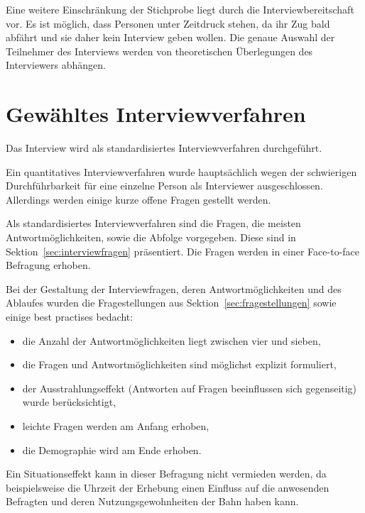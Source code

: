 \documentclass[]{article}
\begin{document}
Eine weitere Einschränkung der Stichprobe liegt durch die Interviewbereitschaft vor. Es ist möglich, dass Personen unter Zeitdruck stehen, da ihr Zug bald abfährt und sie daher kein Interview geben wollen. Die genaue Auswahl der Teilnehmer des Interviews werden von theoretischen Überlegungen des Interviewers abhängen.

\section{Gewähltes Interviewverfahren}
Das Interview wird als standardisiertes Interviewverfahren durchgeführt.

Ein quantitatives Interviewverfahren wurde hauptsächlich wegen der schwierigen Durchführbarkeit für eine einzelne Person als Interviewer ausgeschlossen. Allerdings werden einige kurze offene Fragen gestellt werden.

Als standardisiertes Interviewverfahren sind die Fragen, die meisten Antwortmöglichkeiten, sowie die Abfolge vorgegeben. Diese sind in Sektion~\ref{sec:interviewfragen} präsentiert. Die Fragen werden in einer Face-to-face Befragung erhoben.

Bei der Gestaltung der Interviewfragen, deren Antwortmöglichkeiten und des Ablaufes wurden die Fragestellungen aus Sektion~\ref{sec:fragestellungen} sowie einige best practises bedacht:
\begin{itemize}
	\item die Anzahl der Antwortmöglichkeiten liegt zwischen vier und sieben,
	\item die Fragen und Antwortmöglichkeiten sind möglichst explizit formuliert,
	\item der Ausstrahlungseffekt (Antworten auf Fragen beeinflussen sich gegenseitig) wurde berücksichtigt,
	\item leichte Fragen werden am Anfang erhoben,
	\item die Demographie wird am Ende erhoben.
\end{itemize}

Ein Situationseffekt kann in dieser Befragung nicht vermieden werden, da beispielsweise die Uhrzeit der Erhebung einen Einfluss auf die anwesenden Befragten und deren Nutzungsgewohnheiten der Bahn haben kann.
\end{document}
